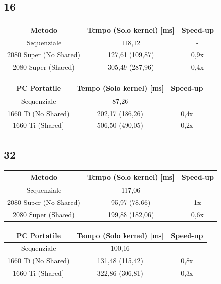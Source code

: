 \documentclass[12pt,a4paper]{report}
\begin{document}
			\subsection{16}
			
			\begin{tabular}{|c|c|c|}
					\hline
					Metodo & Tempo (Solo kernel) [ms] & Speed-up \\
					\hline
					Sequenziale & 118,12 & -  \\
					\hline
					2080 Super (No Shared) & 127,61 (109,87) & 0,9x \\
					\hline
					2080 Super (Shared) & 305,49 (287,96) & 0,4x \\
					\hline
				\end{tabular}
				
				\bigbreak
				
				\begin{tabular}{|c|c|c|}
					\hline
					PC Portatile & Tempo (Solo kernel) [ms] & Speed-up \\
					\hline
					Sequenziale & 87,26 & -  \\
					\hline
					1660 Ti (No Shared) & 202,17 (186,26) & 0,4x \\
					\hline
					1660 Ti (Shared) & 506,50 (490,05) & 0,2x \\
					\hline
				\end{tabular}
			
			\subsection{32}
			
				\begin{tabular}{|c|c|c|}
					\hline
					Metodo & Tempo (Solo kernel) [ms] & Speed-up \\
					\hline
					Sequenziale & 117,06 & -  \\
					\hline
					2080 Super (No Shared) & 95,97 (78,66) & 1x \\
					\hline
					2080 Super (Shared) & 199,88 (182,06) & 0,6x \\
					\hline
				\end{tabular}
				
				\bigbreak
				
				\begin{tabular}{|c|c|c|}
					\hline
					PC Portatile & Tempo (Solo kernel) [ms] & Speed-up \\
					\hline
					Sequenziale & 100,16 & -  \\
					\hline
					1660 Ti (No Shared) & 131,48 (115,42) & 0,8x \\
					\hline
					1660 Ti (Shared) & 322,86 (306,81) & 0,3x \\
					\hline
				\end{tabular}
\end{document}
